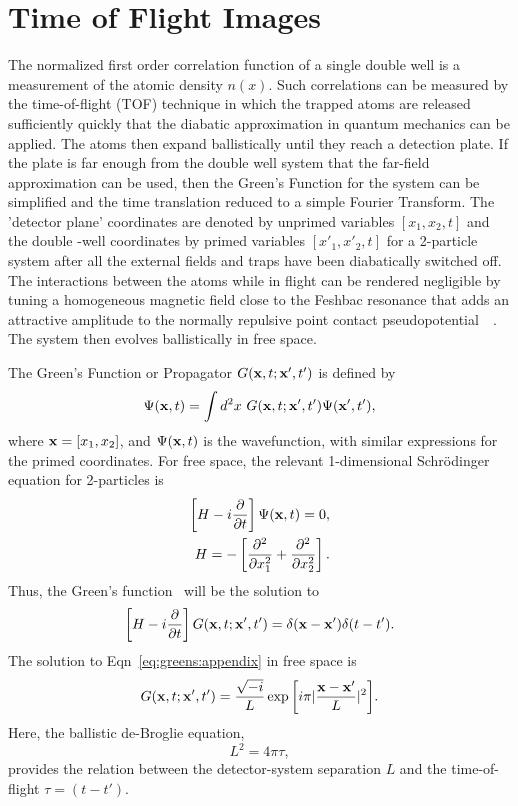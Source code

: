 \documentclass{article}
\begin{document}
\section{ Time of Flight Images} 
\label{sec:3 }
%
%
The normalized first order correlation function of a single double well is a measurement of the atomic density $n(x)$. Such correlations can be measured by the time-of-flight (TOF) technique in which the trapped atoms are released sufficiently quickly  that the diabatic approximation in quantum mechanics can be applied. The atoms then expand ballistically until they reach a detection plate. If the plate is far enough from the double well system that the far-field approximation can be used, then the Green's Function for the system can be simplified and the time translation reduced to a simple Fourier Transform.  The 'detector plane' coordinates are denoted by unprimed variables $\left[ x_1,x_2,t \right]$ and the double -well coordinates by primed variables $\left[ x'_1,x'_2,t \right]$ for a 2-particle system after all the external fields and traps have been diabatically switched off. The interactions between the atoms while in flight can be rendered negligible by tuning a homogeneous magnetic field close to the Feshbac resonance that adds an attractive amplitude to the normally repulsive point contact pseudopotential~\cite{feshbach:resonance}~\cite{pethick:bec}. The system then evolves ballistically in free space. 

The Green's Function or Propagator $G({\bf x},t;{\bf x}',t')$ is defined by
\begin{equation}
\Psi ({\bf x},t) = \int d^2x \mbox{ } G({\bf x},t;{\bf x}',t') \Psi ({\bf x}',t'),
\label{eq:greensfunction:appendix}
\end{equation}
where ${\bf x} = \left[ x_1, x_2 \right]$, and $\Psi({\bf x},t)$ is the wavefunction, with similar expressions for the primed coordinates. For free space, the relevant 1-dimensional Schr\"odinger equation for 2-particles is
\begin{eqnarray}
\left[ H-i\frac{\partial}{\partial t} \right] \Psi({\bf x},t) =0, \nonumber \\
H=-\left[ \frac{\partial^2}{\partial x^2_1} + \frac{\partial^2}{\partial x^2_2} \right].
\end{eqnarray}
 Thus, the Green's function~\cite{sakurai} will be the solution to
 \begin{equation}
 \left[ H-i\frac{\partial}{\partial t} \right] G({\bf x},t;{\bf x}',t') = \delta ({\bf x}-{\bf x}') \delta (t-t').
 \label{eq:greens:appendix}
 \end{equation}
The solution to Eqn~\ref{eq:greens:appendix} in free space is
\begin{equation}
G({\bf x},t;{\bf x}',t') = \frac{\sqrt{-i}}{L} \exp{\left[ i\pi | \frac{{\bf x}-{\bf x}'}{L}|^2 \right]}.
\label{eq:greensfn:appendix}
\end{equation}
Here, the ballistic de-Broglie equation,
\begin{equation}
L^2=4 \pi \tau,
\label{eq:debroglie }
\end{equation}
 provides the relation between the detector-system separation $L$ and the time-of-flight $\tau=\left(t-t'\right)$.
\end{document}

